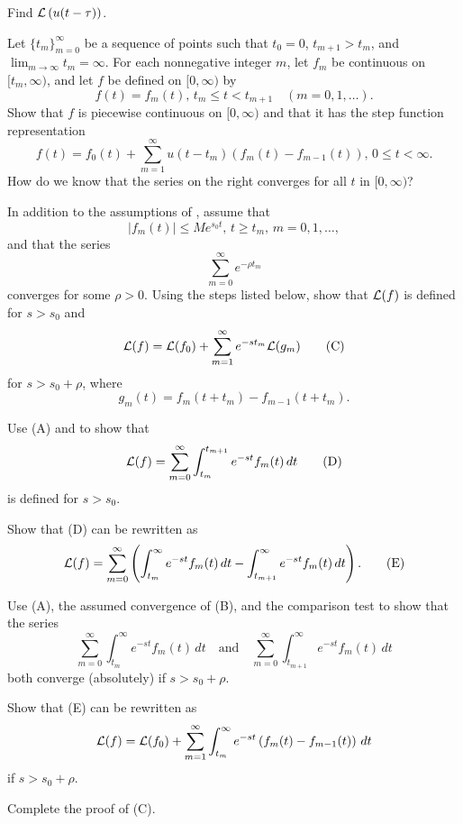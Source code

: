 \begin{exerciselist}

\item\label{exer:8.4.29}Find ${\mathcal L}\left(u(t-\tau)\right)$.


\item\label{exer:8.4.30}Let $\{t_m\}_{m=0}^\infty$ be a sequence of points such that $t_0=0$,
$t_{m+1}>t_m$, and $\lim_{m\to\infty}t_m=\infty$. For each nonnegative
integer $m$, let $f_m$ be continuous on $[t_m,\infty)$, and let $f$ be
defined on $[0,\infty)$ by
\[
f(t)=f_m(t),\,t_m\le t<t_{m+1}\quad (m=0,1,\dots).
\]
Show that $f$ is piecewise continuous on $[0,\infty)$  and
that it has the step function representation
\[
f(t)=f_0(t)+\sum_{m=1}^\infty u(t-t_m)\left(f_m(t)-f_{m-1}(t)\right),\,
0\le t<\infty.
\]
How do we know that the series on the right converges for all $t$
in $[0,\infty)$?

\item\label{exer:8.4.31}In addition to the assumptions of ,
assume that
\[
|f_m(t)|\le Me^{s_0t},\,t\ge t_m,\,m=0,1,\dots,
\tag{A}
\]
and that the series
\[
\sum_{m=0}^\infty e^{-\rho t_m}
\tag{B}
\]
converges for some $\rho>0$. Using the  steps listed below, show
that
${\mathcal L}(f)$ is defined for $s>s_0$  and
\[
{\mathcal L}(f)={\mathcal L}(f_0)+\sum_{m=1}^\infty e^{-st_m}{\mathcal L}(g_m)
\tag{C}
\]
for $s>s_0+\rho$,
where
\[
g_m(t)=f_m(t+t_m)-f_{m-1}(t+t_m).
\]

\begin{alist} %
\item
Use (A) and  to show that
\[
{\mathcal L}(f)=\sum_{m=0}^\infty\int_{t_m}^{t_{m+1}}e^{-st}f_m(t)\,dt
\tag{D}
\]
is defined for $s>s_0$.
\item %
Show that  (D) can be rewritten as
\[
{\mathcal L}(f)=\sum_{m=0}^\infty\left(\int_{t_m}^\infty e^{-st}f_m(t)\,dt
-\int_{t_{m+1}}^\infty e^{-st}f_m(t)\,dt\right).
\tag{E}
\]
\item %
Use  (A), the assumed convergence of  (B), and the
comparison test  to show that the series
\[
\sum_{m=0}^\infty\int_{t_m}^\infty e^{-st}f_m(t)\,dt\quad\text{and}\quad 
\sum_{m=0}^\infty\int_{t_{m+1}}^\infty e^{-st}f_m(t)\,dt
\]
both converge (absolutely) if $s>s_0+\rho$.
\item %
Show that  (E) can be rewritten as
 \[
{\mathcal L}(f)={\mathcal L}(f_0)+\sum_{m=1}^\infty\int_{t_m}^\infty e^{-st}
\left(f_m(t)-f_{m-1}(t)\right)\,dt
\]
if $s>s_0+\rho$.
\item %
Complete the proof of  (C).
\end{alist}


\end{exerciselist}
